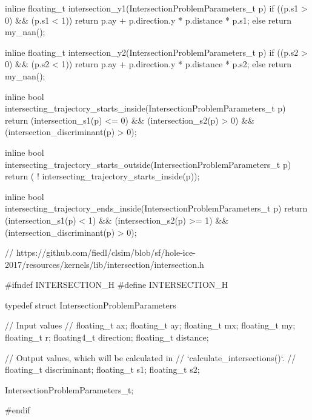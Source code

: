 \begin{ccode}
inline floating_t intersection_y1(IntersectionProblemParameters_t p)
{
  if ((p.s1 > 0) && (p.s1 < 1))
    return p.ay + p.direction.y * p.distance * p.s1;
  else
    return my_nan();
}

inline floating_t intersection_y2(IntersectionProblemParameters_t p)
{
  if ((p.s2 > 0) && (p.s2 < 1))
    return p.ay + p.direction.y * p.distance * p.s2;
  else
    return my_nan();
}

inline bool intersecting_trajectory_starts_inside(IntersectionProblemParameters_t p)
{
  return (intersection_s1(p) <= 0) &&
      (intersection_s2(p) > 0) &&
      (intersection_discriminant(p) > 0);
}

inline bool intersecting_trajectory_starts_outside(IntersectionProblemParameters_t p)
{
  return ( ! intersecting_trajectory_starts_inside(p));
}

inline bool intersecting_trajectory_ends_inside(IntersectionProblemParameters_t p)
{
  return (intersection_s1(p) < 1) &&
      (intersection_s2(p) >= 1) &&
      (intersection_discriminant(p) > 0);
}
\end{ccode}

\begin{ccode}
// https://github.com/fiedl/clsim/blob/sf/hole-ice-2017/resources/kernels/lib/intersection/intersection.h

#ifndef INTERSECTION_H
#define INTERSECTION_H

typedef struct IntersectionProblemParameters {

  // Input values
  //
  floating_t ax;
  floating_t ay;
  floating_t mx;
  floating_t my;
  floating_t r;
  floating4_t direction;
  floating_t distance;

  // Output values, which will be calculated in
  // `calculate_intersections()`.
  //
  floating_t discriminant;
  floating_t s1;
  floating_t s2;

} IntersectionProblemParameters_t;

#endif
\end{ccode}

